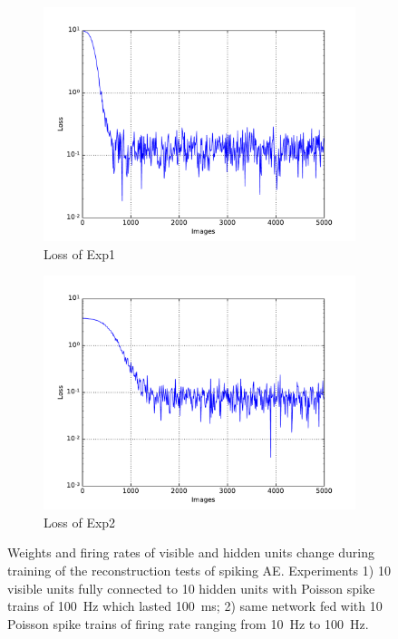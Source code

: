 \begin{figure}
\begin{subfigure}[t]{0.4\textwidth}
		\includegraphics[width=\textwidth]{pics_sdlm/07_exp_SAE_all_long/exp1_mse_nons.pdf}
		\caption{Loss of Exp1}
	\end{subfigure}
	\begin{subfigure}[t]{0.4\textwidth}
		\includegraphics[width=\textwidth]{pics_sdlm/07_exp_SAE_all_long/exp2_mse_nons.pdf}
		\caption{Loss of Exp2}
	\end{subfigure}
	\caption{Weights and firing rates of visible and hidden units change during training of the reconstruction tests of spiking AE. 
		Experiments 1) 10 visible units fully connected to 10 hidden units with Poisson spike trains of 100~Hz which lasted 100~ms; 2) same network fed with 10 Poisson spike trains of firing rate ranging from 10~Hz to 100~Hz.}
\end{figure}


